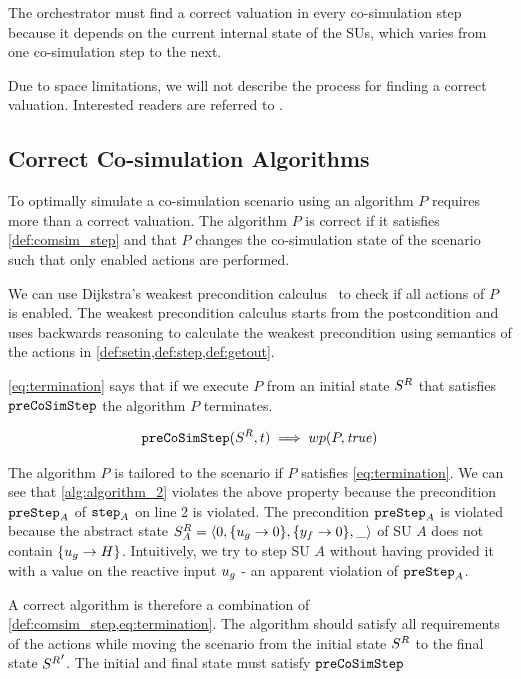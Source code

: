 The orchestrator must find a correct valuation in every co-simulation step because it depends on the current internal state of the SUs, which varies from one co-simulation step to the next.

Due to space limitations, we will not describe the process for finding a correct valuation. 
Interested readers are referred to \cite{thrane2021}.

\subsection{Correct Co-simulation Algorithms}\label{sec:correctcosim}
To optimally simulate a co-simulation scenario using an algorithm $P$ requires more than a correct valuation. 
The algorithm $P$ is correct if it satisfies \cref{def:comsim_step} and that $P$ changes the co-simulation state of the scenario such that only enabled actions are performed.

We can use Dijkstra's weakest precondition calculus~ to check if all actions of $P$ is enabled.
The weakest precondition calculus starts from the postcondition and uses backwards reasoning to calculate the weakest precondition using semantics of the actions in \cref{def:setin,def:step,def:getout}.

\cref{eq:termination} says that if we execute $P$ from an initial state $S^{R}_{}$ that satisfies $\mathtt{preCoSimStep}$ the algorithm $P$ terminates.

\begin{align}\label{eq:termination}
  \mathtt{preCoSimStep}(S^{R}_{}, t) \implies wp(P, \mathit{true})
\end{align}

The algorithm $P$ is tailored to the scenario if $P$ satisfies \cref{eq:termination}.
We can see that \cref{alg:algorithm_2} violates the above property because the precondition $\mathtt{preStep}_{A}$ of $\mathtt{step}_{A}$ on line 2 is violated.
The precondition $\mathtt{preStep}_{A}$ is violated because the abstract state $S^{R}_{A} =  \left\langle 0,\{u_{g} \to 0 \}, \{y_{f} \to 0 \}, \_ \right\rangle $ of SU $A$ does not contain $\{u_{g} \to H \}$.
Intuitively, we try to step SU $A$ without having provided it with a value on the reactive input $u_{g}$ - an apparent violation of $\mathtt{preStep}_{A}$.

A correct algorithm is therefore a combination of \cref{def:comsim_step,eq:termination}.
The algorithm should satisfy all requirements of the actions while moving the scenario from the initial state $S^{R}_{}$ to the final state ${S^{R}_{}}'$.
The initial and final state must satisfy $\mathtt{preCoSimStep}$

